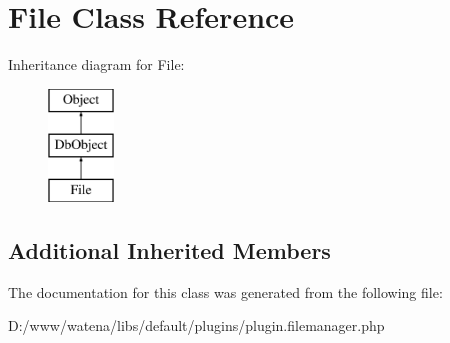 \hypertarget{class_file}{\section{File Class Reference}
\label{class_file}
}
Inheritance diagram for File\-:\begin{figure}[H]
\begin{center}
\leavevmode
\includegraphics[height=3.000000cm]{class_file}
\end{center}
\end{figure}
\subsection*{Additional Inherited Members}


The documentation for this class was generated from the following file\-:\begin{DoxyCompactItemize}
\item 
D\-:/www/watena/libs/default/plugins/plugin.\-filemanager.\-php\end{DoxyCompactItemize}
